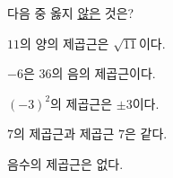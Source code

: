 다음 중 옳지 \underline{않은} 것은?
\begin{choicesv}{\rule[-3ex]{0pt}{8ex}$11$의 양의 제곱근은 $\sqrt{11}$이다.}{\rule[-3ex]{0pt}{8ex}$-6$은 $36$의 음의 제곱근이다.}{\rule[-3ex]{0pt}{8ex}$(-3)^2$의 제곱근은 $\pm 3$이다.}{\rule[-3ex]{0pt}{8ex}$7$의 제곱근과 제곱근 $7$은 같다.}{\rule[-3ex]{0pt}{8ex}음수의 제곱근은 없다.}\end{choicesv}
